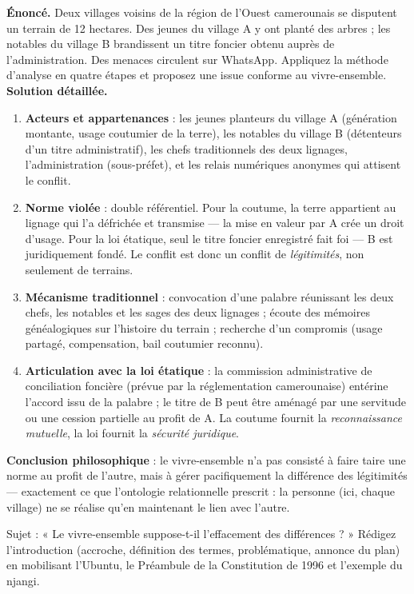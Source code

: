 \documentclass[11pt]{article}
\begin{document}
\begin{exoresolu}
\textbf{Énoncé.} Deux villages voisins de la région de l'Ouest camerounais se disputent un terrain de 12 hectares. Des jeunes du village A y ont planté des arbres ; les notables du village B brandissent un titre foncier obtenu auprès de l'administration. Des menaces circulent sur WhatsApp. Appliquez la méthode d'analyse en quatre étapes et proposez une issue conforme au vivre-ensemble.
\tcblower
\textbf{Solution détaillée.}
\begin{enumerate}
\item \textbf{Acteurs et appartenances} : les jeunes planteurs du village A (génération montante, usage coutumier de la terre), les notables du village B (détenteurs d'un titre administratif), les chefs traditionnels des deux lignages, l'administration (sous-préfet), et les relais numériques anonymes qui attisent le conflit.
\item \textbf{Norme violée} : double référentiel. Pour la coutume, la terre appartient au lignage qui l'a défrichée et transmise — la mise en valeur par A crée un droit d'usage. Pour la loi étatique, seul le titre foncier enregistré fait foi — B est juridiquement fondé. Le conflit est donc un conflit de \emph{légitimités}, non seulement de terrains.
\item \textbf{Mécanisme traditionnel} : convocation d'une palabre réunissant les deux chefs, les notables et les sages des deux lignages ; écoute des mémoires généalogiques sur l'histoire du terrain ; recherche d'un compromis (usage partagé, compensation, bail coutumier reconnu).
\item \textbf{Articulation avec la loi étatique} : la commission administrative de conciliation foncière (prévue par la réglementation camerounaise) entérine l'accord issu de la palabre ; le titre de B peut être aménagé par une servitude ou une cession partielle au profit de A. La coutume fournit la \emph{reconnaissance mutuelle}, la loi fournit la \emph{sécurité juridique}.
\end{enumerate}
\textbf{Conclusion philosophique} : le vivre-ensemble n'a pas consisté à faire taire une norme au profit de l'autre, mais à gérer pacifiquement la différence des légitimités — exactement ce que l'ontologie relationnelle prescrit : la personne (ici, chaque village) ne se réalise qu'en maintenant le lien avec l'autre.
\end{exoresolu}

\begin{exercice}
Sujet : « Le vivre-ensemble suppose-t-il l'effacement des différences ? » Rédigez l'introduction (accroche, définition des termes, problématique, annonce du plan) en mobilisant l'Ubuntu, le Préambule de la Constitution de 1996 et l'exemple du njangi.
\end{exercice}
\end{document}
